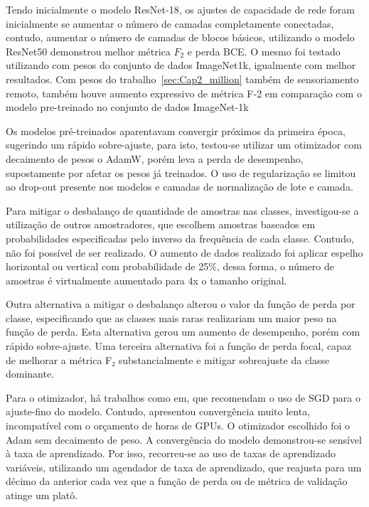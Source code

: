 Tendo inicialmente o modelo ResNet-18, os ajustes de capacidade de rede foram inicialmente se aumentar o número de camadas completamente conectadas, contudo, aumentar o número de camadas de blocos básicos, utilizando o modelo ResNet50 demonstrou melhor métrica $F_2$ e perda BCE. O mesmo foi testado utilizando com pesos do conjunto de dados ImageNet1k, igualmente com melhor resultados. Com pesos do trabalho~\ref{sec:Cap2_million} também de sensoriamento remoto, também houve aumento expressivo de métrica F-2 em comparação com o modelo pre-treinado no conjunto de dados ImageNet-1k

Os modelos pré-treinados aparentavam convergir próximos da primeira época, sugerindo um rápido sobre-ajuste, para isto, testou-se utilizar um otimizador com decaimento de pesos o AdamW, porém leva a perda de desempenho, supostamente por afetar os pesos já treinados. O uso de regularização se limitou ao drop-out presente nos modelos e camadas de normalização de lote e camada.

Para mitigar o desbalanço de quantidade de amostras nas classes, investigou-se a utilização de outros amostradores, que escolhem amostras baseados em probabilidades especificadas pelo inverso da frequência de cada classe. Contudo, não foi possível de ser realizado. O aumento de dados realizado foi aplicar espelho horizontal ou vertical com probabilidade de 25\%, dessa forma, o número de amostras é virtualmente aumentado para 4x o tamanho original.

Outra alternativa a mitigar o desbalanço alterou o valor da função de perda por classe, especificando que as classes mais raras realizariam um maior peso na função de perda. Esta alternativa gerou um aumento de desempenho, porém com rápido sobre-ajuste. Uma terceira alternativa foi a função de perda focal, capaz de melhorar a métrica F₂ substancialmente e mitigar sobreajuste da classe dominante.

Para o otimizador, há trabalhos como em\cite{https://doi.org/10.48550/arxiv.2106.10270}, que recomendam o uso de SGD para o ajuste-fino do modelo. Contudo, apresentou convergência muito lenta, incompatível com o orçamento de horas de GPUs. O otimizador escolhido foi o Adam sem decaimento de peso. A convergência do modelo demonstrou-se sensível à taxa de aprendizado. Por isso, recorreu-se ao uso de taxas de aprendizado variáveis, utilizando um agendador de taxa de aprendizado, que reajusta para um décimo da anterior cada vez que a função de perda ou de métrica de validação atinge um platô.

